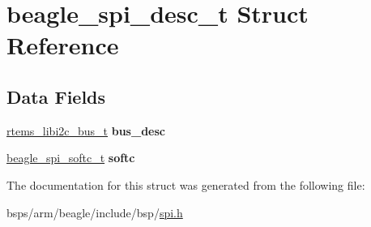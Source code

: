 \hypertarget{structbeagle__spi__desc__t}{}\section{beagle\+\_\+spi\+\_\+desc\+\_\+t Struct Reference}
\label{structbeagle__spi__desc__t}
\subsection*{Data Fields}
\begin{DoxyCompactItemize}
\item 
\mbox{\label{structbeagle__spi__desc__t_ab0ee368c83623dc8cf4b8bbd32f5e0f6}} 
\mbox{\hyperlink{structrtems__libi2c__bus__t__}{rtems\+\_\+libi2c\+\_\+bus\+\_\+t}} {\bfseries bus\+\_\+desc}
\item 
\mbox{\label{structbeagle__spi__desc__t_a78018d3a41840b555efcd5ee8f3c18b5}} 
\mbox{\hyperlink{structbeagle__spi__softc}{beagle\+\_\+spi\+\_\+softc\+\_\+t}} {\bfseries softc}
\end{DoxyCompactItemize}


The documentation for this struct was generated from the following file\+:\begin{DoxyCompactItemize}
\item 
bsps/arm/beagle/include/bsp/\mbox{\hyperlink{bsps_2arm_2beagle_2include_2bsp_2spi_8h}{spi.\+h}}\end{DoxyCompactItemize}
